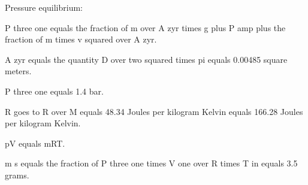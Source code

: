 Pressure equilibrium:

P three one equals the fraction of m over A zyr times g plus P amp plus the fraction of m times v squared over A zyr.

A zyr equals the quantity D over two squared times pi equals 0.00485 square meters.

P three one equals 1.4 bar.

R goes to R over M equals 48.34 Joules per kilogram Kelvin equals 166.28 Joules per kilogram Kelvin.

pV equals mRT.

m s equals the fraction of P three one times V one over R times T in equals 3.5 grams.
